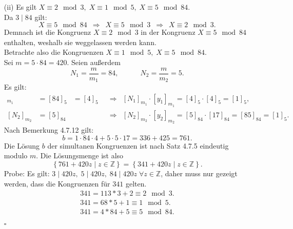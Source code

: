 \documentclass[12pt]{article}
\newcommand{\QED}{\begin{flushright} $\square$ \end{flushright}}
\newcommand{\df}{\enspace\Longrightarrow\enspace}
\begin{document}
\begin{enumerate}
\begin{enumerate}
		\item[(ii)] Es gilt $X\equiv2\mod3,\;X\equiv1\mod5,\;X\equiv5\mod84$. \\
		Da $3\mid84$ gilt:
		$$X\equiv5\mod84\df X\equiv5\mod3\df X\equiv2\mod3.$$
		Demnach ist die Kongruenz $X\equiv2\mod3$ in der Kongruenz $X\equiv5\mod84$ enthalten, weshalb sie weggelassen werden kann. \\
		
		Betrachte also die Kongruenzen $X\equiv1\mod5,\;X\equiv5\mod84$. \\
		Sei $m=5\cdot84=420$.
		Seien außerdem $$N_1=\frac{m}{m_1}=84,\quad\quad\quad N_2=\frac{m}{m_2}=5.$$
		Es gilt:
		\begin{align*}
			[N_1]_{m_1}&=[84]_5&=[4]_5&\df[N_1]_{m_1}\cdot[y_1]_{m_1}=[4]_5\cdot[4]_5=[1]_5, \\
			[N_2]_{m_2}&=[5]_{84}& &\df[N_2]_{m_2}\cdot[y_2]_{m_2}=[5]_{84}\cdot[17]_{84}=[85]_{84}=[1]_5.
		\end{align*}
		Nach Bemerkung 4.7.12 gilt:
		$$b=1\cdot84\cdot4+5\cdot5\cdot17=336+425=761.$$
		Die Lösung $b$ der simultanen Kongruenzen ist nach Satz 4.7.5 eindeutig modulo $m$. Die Lösungsmenge ist also
		$$\left\{761+420z\mid z\in\mathbb{Z}\right\}=\left\{341+420z\mid z\in\mathbb{Z}\right\}.$$
		Probe:
		Es gilt: $3\mid 420z,\;5\mid420z,\;84\mid420z\;\forall z\in\mathbb{Z}$, daher muss nur gezeigt werden, dass die Kongruenzen für $341$ gelten. \\
		\begin{align*}
			341 = 113*3+2 \equiv 2\mod3. \\
			341 = 68*5+1 \equiv 1\mod5. \\
			341 = 4*84+5 \equiv 5\mod84.
		\end{align*}
		\QED
	\end{enumerate}
	

\end{enumerate}
\end{document}
